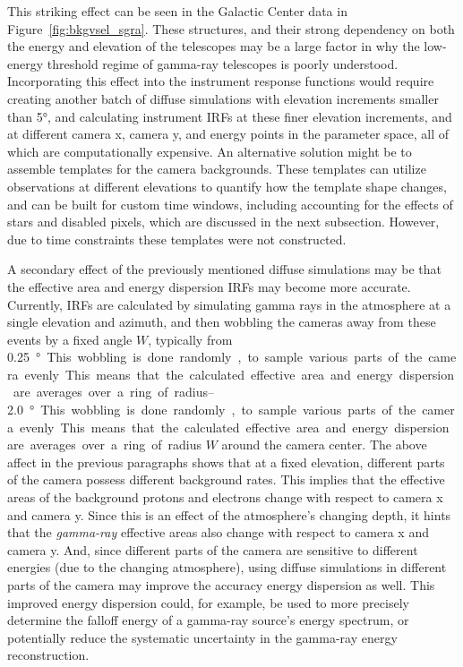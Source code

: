     This striking effect can be seen in the Galactic Center data in Figure~\ref{fig:bkgvsel_sgra}.
    These structures, and their strong dependency on both the energy and elevation of the telescopes may be a large factor in why the low-energy threshold regime of gamma-ray telescopes is poorly understood.
    Incorporating this effect into the instrument response functions would require creating another batch of diffuse simulations with elevation increments smaller than \ang{5}, and calculating instrument IRFs at these finer elevation increments, and at different camera x, camera y, and energy points in the parameter space, all of which are computationally expensive.
    An alternative solution might be to assemble templates for the camera backgrounds.
    These templates can utilize observations at different elevations to quantify how the template shape changes, and can be built for custom time windows, including accounting for the effects of stars and disabled pixels, which are discussed in the next subsection.
    However, due to time constraints these templates were not constructed.
    
    A secondary effect of the previously mentioned diffuse simulations may be that the effective area and energy dispersion IRFs may become more accurate.
    Currently, IRFs are calculated by simulating gamma rays in the atmosphere at a single elevation and azimuth, and then wobbling the cameras away from these events by a fixed angle $W$, typically from \SIrange{0.25}{2.0}\degree.
    This wobbling is done randomly, to sample various parts of the camera evenly.
    This means that the calculated effective area and energy dispersion are averages over a ring of radius $W$ around the camera center.
    The above affect in the previous paragraphs shows that at a fixed elevation, different parts of the camera possess different background rates.
    This implies that the effective areas of the background protons and electrons change with respect to camera x and camera y.
    Since this is an effect of the atmosphere's changing depth, it hints that the \textit{gamma-ray} effective areas also change with respect to camera x and camera y.
    And, since different parts of the camera are sensitive to different energies (due to the changing atmosphere), using diffuse simulations in different parts of the camera may improve the accuracy energy dispersion as well.
    This improved energy dispersion could, for example, be used to more precisely determine the falloff energy of a gamma-ray source's energy spectrum, or potentially reduce the systematic uncertainty in the gamma-ray energy reconstruction.
  
